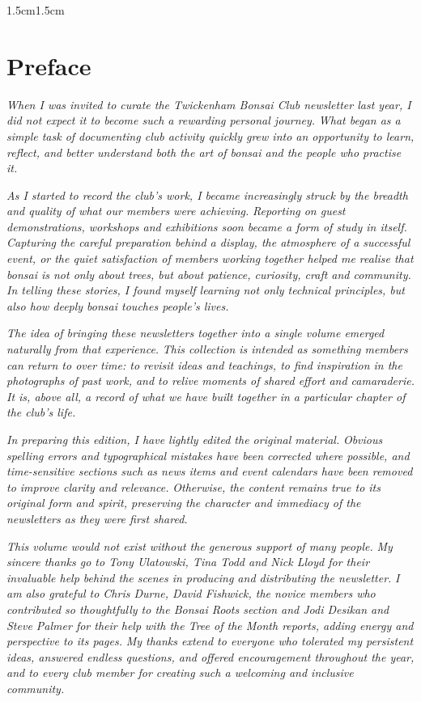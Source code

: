 \begin{adjustwidth}{1.5cm}{1.5cm}
    \chapter*{Preface}
    \textit{When I was invited to curate the Twickenham Bonsai Club newsletter last year, I did not expect it to become such a rewarding personal journey.}
    \textit{What began as a simple task of documenting club activity quickly grew into an opportunity to learn, reflect, and better understand both the art of bonsai and the people who practise it.}

    \null
    \textit{As I started to record the club's work, I became increasingly struck by the breadth and quality of what our members were achieving.}
    \textit{Reporting on guest demonstrations, workshops and exhibitions soon became a form of study in itself.}
    \textit{Capturing the careful preparation behind a display, the atmosphere of a successful event, or the quiet satisfaction of members working together helped me realise that bonsai is not only about trees, but about patience, curiosity, craft and community.}
    \textit{In telling these stories, I found myself learning not only technical principles, but also how deeply bonsai touches people's lives.}

    \null
    \textit{The idea of bringing these newsletters together into a single volume emerged naturally from that experience.}
    \textit{This collection is intended as something members can return to over time: to revisit ideas and teachings, to find inspiration in the photographs of past work, and to relive moments of shared effort and camaraderie.}
    \textit{It is, above all, a record of what we have built together in a particular chapter of the club's life.}

    \null
    \textit{In preparing this edition, I have lightly edited the original material.}
    \textit{Obvious spelling errors and typographical mistakes have been corrected where possible, and time\--sensitive sections such as news items and event calendars have been removed to improve clarity and relevance.}
    \textit{Otherwise, the content remains true to its original form and spirit, preserving the character and immediacy of the newsletters as they were first shared.}

    \null
    \textit{This volume would not exist without the generous support of many people.}
    \textit{My sincere thanks go to Tony Ulatowski, Tina Todd and Nick Lloyd for their invaluable help behind the scenes in producing and distributing the newsletter.}
    \textit{I am also grateful to Chris Durne, David Fishwick, the novice members who contributed so thoughtfully to the \textit{Bonsai Roots} section and Jodi Desikan and Steve Palmer for their help with the \textit{Tree of the Month} reports, adding energy and perspective to its pages.}
    \textit{My thanks extend to everyone who tolerated my persistent ideas, answered endless questions, and offered encouragement throughout the year, and to every club member for creating such a welcoming and inclusive community.}


\end{adjustwidth}
